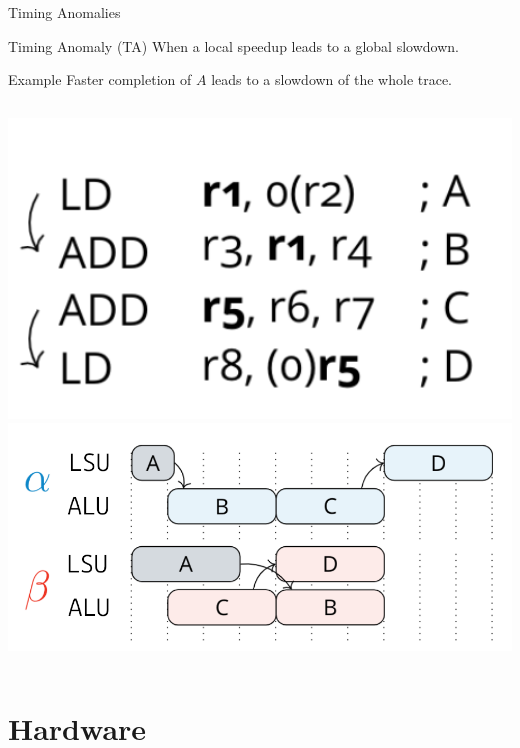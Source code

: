 \documentclass{beamer}
\begin{document}


\begin{frame}{Timing Anomalies}
    \begin{block}{Timing Anomaly (TA)}
        When a local speedup leads to a global slowdown.
    \end{block}

    \begin{exampleblock}{Example}
        Faster completion of $A$ leads to a slowdown of the whole trace. 
    \end{exampleblock}

    \begin{columns}
        \includegraphics[width=1\textwidth]{pic/first-TA-ex-input.png}
        \includegraphics[width=1\textwidth]{pic/first-TA-ex-trace.png}
    \end{columns}
\end{frame}

% 

\section{Hardware}
\end{document}
